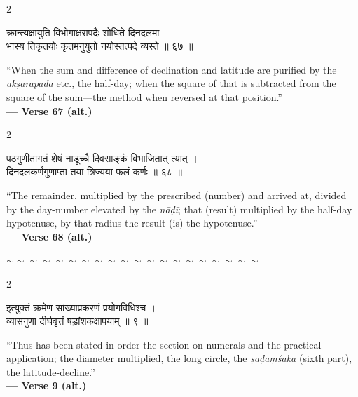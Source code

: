 \documentclass[11pt,a4paper]{article}
\newcommand{\dev}[1]{{\devanagarifont #1}}
\newenvironment{bilingualverse}{%
  \begin{paracol}{2}
  \fontsize{10.5}{13}\selectfont
}{%
  \end{paracol}
  \vspace{0.3cm}
}
\newcommand{\wavydivider}{\begin{center}$\sim\sim\sim\sim\sim\sim\sim\sim\sim\sim\sim\sim\sim\sim\sim\sim\sim\sim\sim\sim$\end{center}}
\begin{document}
\begin{bilingualverse}
\begin{leftcolumn*}
\dev{क्रान्त्यक्षायुति विभोगाक्षरापदैः शोधिते दिनदलमा ।}\\
\dev{भास्य तिकृतयोः कृतमनुयुतो नयोस्तत्पदे व्यस्ते ॥ ६७ ॥}
\end{leftcolumn*}
\begin{rightcolumn}
``When the sum and difference of declination and latitude are purified by the \textit{akṣarāpada} etc., the half-day; when the square of that is subtracted from the square of the sum---the method when reversed at that position.''\\[0.3cm]
\hfill\textbf{— Verse 67 (alt.)}
\end{rightcolumn}
\end{bilingualverse}

\begin{bilingualverse}
\begin{leftcolumn*}
\dev{पठगुणीतागतं शेषं नाडूच्चै दिवसाङ्कं विभाजितात् त्यात् ।}\\
\dev{दिनदलकर्णगुणाप्ता तया त्रिज्यया फलं कर्णः ॥ ६८ ॥}
\end{leftcolumn*}
\begin{rightcolumn}
``The remainder, multiplied by the prescribed (number) and arrived at, divided by the day-number elevated by the \textit{nāḍī}; that (result) multiplied by the half-day hypotenuse, by that radius the result (is) the hypotenuse.''\\[0.3cm]
\hfill\textbf{— Verse 68 (alt.)}
\end{rightcolumn}
\end{bilingualverse}

\wavydivider

\begin{bilingualverse}
\begin{leftcolumn*}
\dev{इत्युक्तं क्रमेण सांख्याप्रकरणं प्रयोगविधिश्च ।}\\
\dev{व्यासगुणा दीर्घवृत्तं षड़ांशकक्षापयाम् ॥ ९ ॥}
\end{leftcolumn*}
\begin{rightcolumn}
``Thus has been stated in order the section on numerals and the practical application; the diameter multiplied, the long circle, the \textit{ṣaḍāṃśaka} (sixth part), the latitude-decline.''\\[0.3cm]
\hfill\textbf{— Verse 9 (alt.)}
\end{rightcolumn}
\end{bilingualverse}
\end{document}
